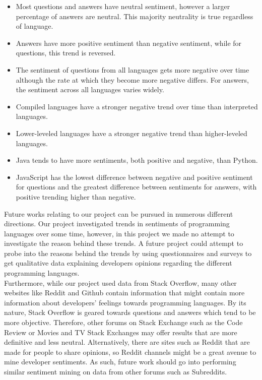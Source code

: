 \documentclass[conference]{IEEEtran}
\begin{document}
\begin{itemize}
    \item Most questions and answers have neutral sentiment, however a larger percentage of answers are neutral. This majority neutrality is true regardless of language.
    \item Answers have more positive sentiment than negative sentiment, while for questions, this trend is reversed. 
    \item The sentiment of questions from all languages gets more negative over time although the rate at which they become more negative differs. For answers, the sentiment across all languages varies widely.
    \item Compiled languages have a stronger negative trend over time than interpreted languages.
    \item Lower-leveled languages have a stronger negative trend than higher-leveled languages. 
    \item Java tends to have more sentiments, both positive and negative, than Python.
    \item JavaScript has the lowest difference between negative and positive sentiment for questions and the greatest difference between sentiments for answers, with positive trending higher than negative.\\
\end{itemize}

Future works relating to our project can be pursued in numerous different directions. Our project investigated trends in sentiments of programming languages over some time, however, in this project we made no attempt to investigate the reason behind these trends. A future project could attempt to probe into the reasons behind the trends by using questionnaires and surveys to get qualitative data explaining developers opinions regarding the different programming languages.\\

Furthermore, while our project used data from Stack Overflow, many other websites like Reddit and Github contain information that might contain more information about developers' feelings towards programming languages. By its nature, Stack Overflow is geared towards questions and answers which tend to be more objective. Therefore, other forums on Stack Exchange such as the Code Review or Movies and TV Stack Exchanges may offer results that are more definitive and less neutral. Alternatively, there are sites such as Reddit that are made for people to share opinions, so Reddit channels might be a great avenue to mine developer sentiments. As such, future work should go into performing similar sentiment mining on data from other forums such as Subreddits. \\
\end{document}
